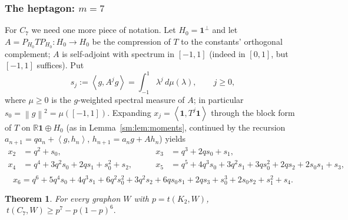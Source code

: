 \documentclass[11pt]{article}
\newtheorem{theorem}{Theorem}[section]
\theoremstyle{remark}
\theoremstyle{plain}
\theoremstyle{plain}
\newcommand{\one}{\mathbf 1}
\newcommand{\ip}[2]{\left\langle #1,#2\right\rangle}
\newcommand{\norm}[1]{\left\|#1\right\|}
\begin{document}
\subsubsection{The heptagon: \texorpdfstring{$m=7$}{m=7}}\label{sm:sub:C7}

For $C_7$ we need one more piece of notation.  Let $H_0=\one^{\perp}$ and let
$A=P_{H_0}TP_{H_0}\colon H_0\to H_0$ be the compression of $T$ to the
constants' orthogonal complement; $A$ is self-adjoint with spectrum in
$[-1,1]$ (indeed in $[0,1]$, but $[-1,1]$ suffices).  Put
\[
   s_j:=\ip{g}{A^{j}g}=\int_{-1}^{1}\lambda^{j}\,d\mu(\lambda),
   \qquad j\ge0,
\]
where $\mu\ge0$ is the $g$-weighted spectral measure of $A$; in particular
$s_0=\norm{g}^{2}=\mu([-1,1])$.  Expanding
$x_j=\ip{\one}{T^{j}\one}$ through the block form of $T$ on
$\mathbb R\one\oplus H_0$ (as in Lemma~\ref{sm:lem:moments}, continued by the
recursion $a_{n+1}=qa_n+\ip{g}{h_n}$, $h_{n+1}=a_ng+Ah_n$) yields
\[
\begin{aligned}
   x_2&=q^{2}+s_0, & x_3&=q^{3}+2qs_0+s_1,\\
   x_4&=q^{4}+3q^{2}s_0+2qs_1+s_0^{2}+s_2,\qquad
   & x_5&=q^{5}+4q^{3}s_0+3q^{2}s_1+3qs_0^{2}+2qs_2+2s_0s_1+s_3,\\
\end{aligned}
\]
\[
   x_6=q^{6}+5q^{4}s_0+4q^{3}s_1+6q^{2}s_0^{2}+3q^{2}s_2
       +6qs_0s_1+2qs_3+s_0^{3}+2s_0s_2+s_1^{2}+s_4 .
\]

\begin{theorem}\label{sm:thm:C7}
For every graphon $W$ with $p=t(K_2,W)$,
$\ t(C_7,W)\ge p^{7}-p(1-p)^{6}.$
\end{theorem}
\end{document}
